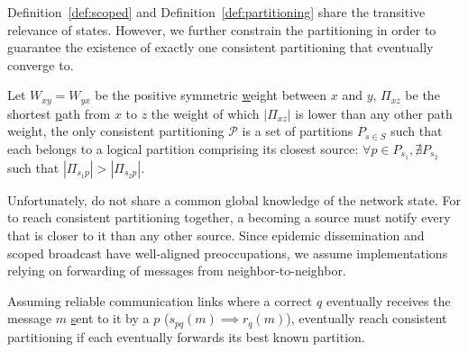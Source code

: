 Definition~\ref{def:scoped} and Definition~\ref{def:partitioning}
share the transitive relevance of \process states. However, we further
constrain the partitioning in order to guarantee the existence of
exactly one consistent partitioning that \processes eventually converge
to.

\begin{definition}
  Let $W_{xy} = W_{yx}$ be the positive symmetric \underline{w}eight
  between $x$ and $y$, $\Pi_{xz}$ be the shortest \underline{p}ath
  from $x$ to $z$ the weight of which $|\Pi_{xz}|$ is lower than any
  other path weight, the only consistent partitioning $\mathcal{P}$ is
  a set of partitions $P_{s\in S}$ such that each \process belongs to
  a logical partition comprising its closest source: $\forall p \in
  P_{s_1}, \nexists P_{s_2}$ such that $|\Pi_{s_1p}| > |\Pi_{s_2p}|$.
\end{definition}

Unfortunately, \processes do not share a common global knowledge of
the network state. For \processes to reach consistent partitioning
together, a \process becoming a source must notify every \process that
is closer to it than any other source. Since epidemic dissemination
and scoped broadcast have well-aligned preoccupations, we assume
implementations relying on forwarding of messages from
neighbor-to-neighbor.

\begin{theorem}
%
Assuming reliable communication links where a correct \process $q$
eventually receives the message $m$ \underline{s}ent to it by a
\process $p$ ($s_{pq}(m) \implies r_{q}(m)$), \processes eventually
reach consistent partitioning if each \process eventually forwards its
best known partition.
\end{theorem}

 

